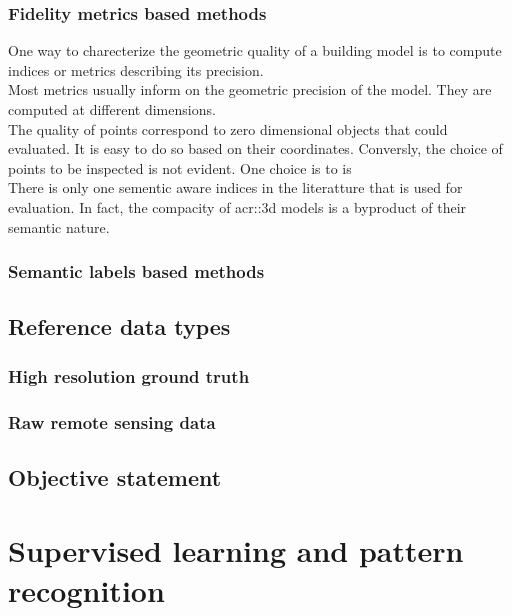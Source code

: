         \subsubsection{Fidelity metrics based methods}
            One way to charecterize the geometric quality of a building model is to compute indices or metrics describing its precision.\\

            Most metrics usually inform on the geometric precision of the model.
            They are computed at different dimensions.\\
            The quality of points correspond to zero dimensional objects that could evaluated.
            It is easy to do so based on their coordinates.
            Conversly, the choice of points to be inspected is not evident.
            One choice is to is \\

            There is only one sementic aware indices in the literatture that is used for evaluation.
            In fact, the compacity of \gls{acr::3d} models is a byproduct of their semantic nature.

        \subsubsection{Semantic labels based methods}

    \subsection{Reference data types}
        \label{subsec::state_of_the_art::quality::reference}

        \subsubsection{High resolution ground truth}

        \subsubsection{Raw remote sensing data}

    \subsection{Objective statement}
\section{Supervised learning and pattern recognition}
